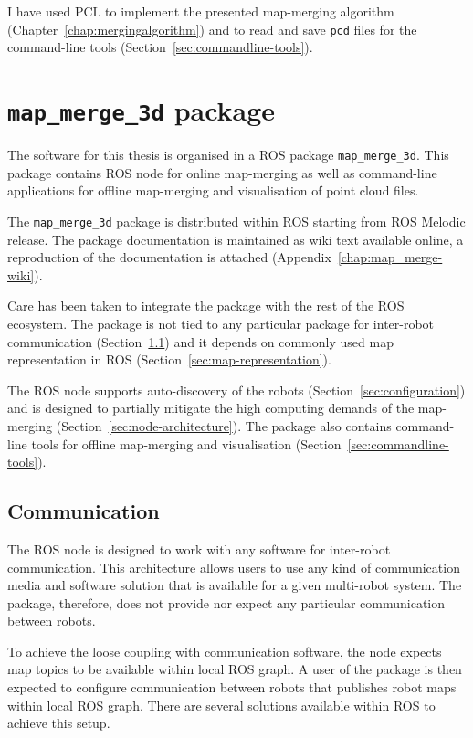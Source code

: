 I have used \gls{PCL} to implement the presented map-merging algorithm (Chapter~\ref{chap:mergingalgorithm}) and to read and save \texttt{pcd} files for the command-line tools (Section~\ref{sec:commandline-tools}).


\section{\texttt{map\_merge\_3d} package}
\label{sec:ros-package}

The software for this thesis is organised in a \gls{ROS} package \texttt{map\_merge\_3d}. This package contains \gls{ROS} node for online map-merging as well as command-line applications for offline map-merging and visualisation of point cloud files.

The \texttt{map\_merge\_3d} package is distributed within \gls{ROS} starting from \gls{ROS} Melodic release. The package documentation is maintained as wiki text available online, a reproduction of the documentation is attached (Appendix~\ref{chap:map_merge-wiki}).

Care has been taken to integrate the package with the rest of the \gls{ROS} ecosystem. The package is not tied to any particular package for inter-robot communication (Section~\ref{sec:communication}) and it depends on commonly used map representation in \gls{ROS} (Section~\ref{sec:map-representation}).

The \gls{ROS} node supports auto-discovery of the robots (Section~\ref{sec:configuration}) and is designed to partially mitigate the high computing demands of the map-merging (Section~\ref{sec:node-architecture}). The package also contains command-line tools for offline map-merging and visualisation (Section~\ref{sec:commandline-tools}).

\subsection{Communication}
\label{sec:communication}

The \gls{ROS} node is designed to work with any software for inter-robot communication. This architecture allows users to use any kind of communication media and software solution that is available for a given multi-robot system. The package, therefore, does not provide nor expect any particular communication between robots.

To achieve the loose coupling with communication software, the node expects map topics to be available within local \gls{ROS} graph. A user of the package is then expected to configure communication between robots that publishes robot maps within local \gls{ROS} graph. There are several solutions available within \gls{ROS} to achieve this setup.

